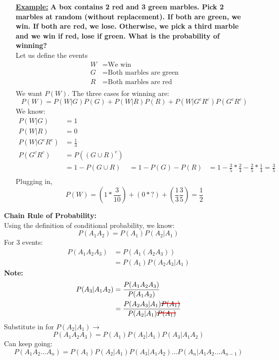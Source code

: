 \documentclass[10pt]{article}
\newcommand\hcancel[2][black]{\setbox0=\hbox{$#2$}%
\rlap{\raisebox{.45\ht0}{\textcolor{#1}{\rule{\wd0}{1pt}}}}#2}
\begin{document}
\begin{flushleft}
\begin{itemize}
\item[\textbf{\underline{Example:}}] \textbf{A box contains 2 red and 3 green
    marbles. Pick 2 marbles at random (without replacement). If both are green,
we win. If both are red, we lose. Otherwise, we pick a third marble and we win
if red, lose if green. What is the probability of winning?} \\
Let us define the events
        $$ \begin{aligned}
            W &= \text{We win} \\
            G &= \text{Both marbles are green}\\
            R &= \text{Both marbles are red}\\
        \end{aligned} $$
        We want $P(W)$. The three cases for winning are:
        $$ P(W) = P(W|G)P(G) + P(W|R)P(R) + P(W|G^cR^c)P(G^cR^c)$$
        We know:
        $$ \begin{aligned}
            P(W|G) &= 1 \\
            P(W|R) &= 0 \\
            P(W|G^cR^c) &= \frac{1}{3} \\
            P(G^cR^c) &= P((G \cup R)^c) \\
                      &= 1 - P(G \cup R)
                      &= 1 - P(G) -P(R)
                      &= 1 - \frac{3}{5} * \frac{2}{4} - \frac{2}{5} *
                      \frac{1}{4} = \frac{3}{5} \\
        \end{aligned} $$
        Plugging in,
        $$ P(W) = (1 * \frac{3}{10}) + (0 * ?) + (\frac{1}{3}\frac{3}{5}) =
        \frac{1}{2} $$
\end{itemize}

   \textbf{Chain Rule of Probability:} \\
   Using the definition of conditional probability, we know:
   $$ P(A_1A_2) = P(A_1)P(A_2|A_1) $$
   For 3 events:
   $$ \begin{aligned}
       P(A_1A_2A_3) &= P(A_1(A_2A_3)) \\
                    &= P(A_1)P(A_2A_3|A_1)
   \end{aligned} $$
   \textbf{Note:}
   $$ \begin{aligned}
       P(A_3|A_1A_2) &= \frac{P(A_1A_2A_3)}{P(A_1A_2)} \\
                     &= \frac{P(A_2A_3|A_1) \hcancel[red]{P(A_1)}}{P(A_2|A_1)
                     \hcancel[red]{P(A_1)}}
   \end{aligned}$$
   Substitute in for $P(A_2|A_1) \rightarrow$
   $$ P(A_1A_2A_3) = P(A_1)P(A_2|A_1)P(A_3|A_1A_2) $$
   Can keep going:
$$ \boxed{P(A_1A_2 ... A_n) = P(A_1)P(A_2|A_1)P(A_3|A_1A_2) ... P(A_n|A_1A_2 ...
A_{n-1})}$$


\end{flushleft}
\end{document}
